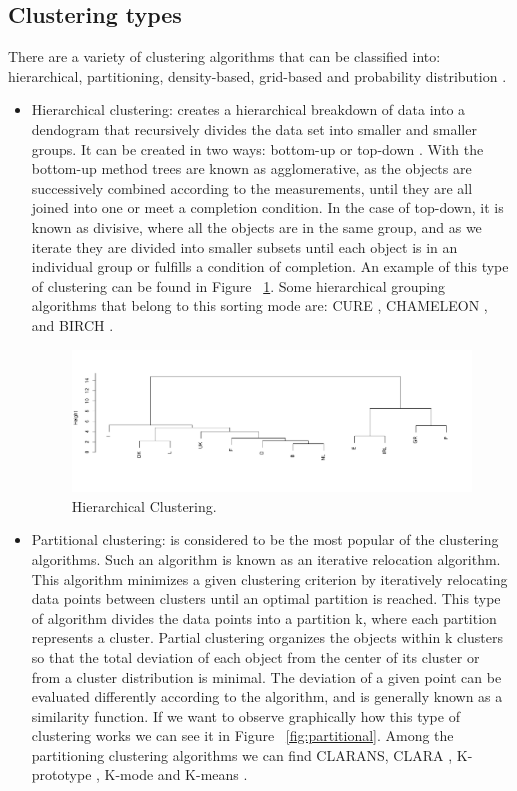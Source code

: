 \subsection{Clustering types}

There are a variety of clustering algorithms that can be classified into: hierarchical, partitioning, density-based, grid-based and probability distribution \citep{R:patibandla-lakshmi-veeranjaneyulu:2018}.
\\
\begin{itemize}
  \item Hierarchical clustering: creates a hierarchical breakdown of data into a dendogram that recursively divides the data set into smaller and smaller groups. It can be created in two ways: bottom-up or top-down \citep{R:jain-murty-flynn:1999}. With the bottom-up method trees are known as agglomerative, as the objects are successively combined according to the measurements, until they are all joined into one or meet a completion condition. In the case of top-down, it is known as divisive, where all the objects are in the same group, and as we iterate they are divided into smaller subsets until each object is in an individual group or fulfills a condition of completion. An example of this type of clustering can be found in Figure ~\ref{fig:hierarchical}. Some hierarchical grouping algorithms that belong to this sorting mode are: CURE \citep{R:guha-rastogi-shim:2001}, CHAMELEON \citep{R:dongwei-jingjing-jici:2019}, and BIRCH \citep{R:tian-raghu-miron:1996}.
\begin{figure}[htbp]
  \centering
   \includegraphics[width=0.9\linewidth, height=0.2\textheight]{img/hierarchical.pdf}
    \caption{Hierarchical Clustering.}
    \label{fig:hierarchical}%
\end{figure}
  \item Partitional clustering: is considered to be the most popular of the clustering algorithms. Such an algorithm is known as an iterative relocation algorithm. This algorithm minimizes a given clustering criterion by iteratively relocating data points between clusters until an optimal partition is reached. This type of algorithm divides the data points into a partition k, where each partition represents a cluster. Partial clustering organizes the objects within k clusters so that the total deviation of each object from the center of its cluster or from a cluster distribution is minimal. The deviation of a given point can be evaluated differently according to the algorithm, and is generally known as a similarity function. If we want to observe graphically how this type of clustering works we can see it in Figure ~\ref{fig:partitional}. Among the partitioning clustering algorithms we can find CLARANS, CLARA \citep{R:h-a:2019}, K-prototype \citep{R:nithya-prabha:2019}, K-mode \citep{R:huang:1997} and K-means \citep{R:mohit-himanshu-chetan:2020}.

\end{itemize}
